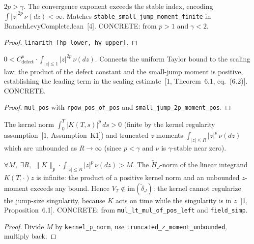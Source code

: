 \begin{theorem}\label{thm:two_p_gt_gamma}
\leanok
{}
$2p > \gamma$. The convergence exponent exceeds the stable index, encoding $\int |z|^{2p}\,\nu(dz) < \infty$. Matches \texttt{stable\_small\_jump\_moment\_finite} in BanachLevyComplete.lean~[4]. CONCRETE: from $p > 1$ and $\gamma < 2$.
\end{theorem}
\begin{proof}\leanok \texttt{linarith [hp\_lower, hγ\_upper]}.\end{proof}

\begin{theorem}\label{thm:defect_norm_from_uniform_bound}
\leanok
{}
$0 < C_{\mathrm{defect}}^p \cdot \int_{|z| \leq 1} |z|^{2p}\,\nu(dz)$. Connects the uniform Taylor bound to the scaling law: the product of the defect constant and the small-jump moment is positive, establishing the leading term in the scaling estimate~[1, Theorem~6.1, eq.~(6.2)]. CONCRETE.
\end{theorem}
\begin{proof}\leanok \texttt{mul\_pos} with \texttt{rpow\_pos\_of\_pos} and \texttt{small\_jump\_2p\_moment\_pos}.\end{proof}

\begin{defn}\label{def:NuSingularityData}
\leanok
The kernel norm $\int_0^T |K(T,s)|^p\,ds > 0$ (finite by the kernel regularity assumption~[1, Assumption~K1]) and truncated $z$-moments $\int_{|z| \leq R} |z|^p\,\nu(dz)$ which are unbounded as $R \to \infty$ (since $p < \gamma$ and $\nu$ is $\gamma$-stable near zero).
\end{defn}

\begin{theorem}\label{thm:nu_singularity_persists}
\leanok
{}
$\forall M,\;\exists R,\;\|K\|_p \cdot \int_{|z| \leq R} |z|^p\,\nu(dz) > M$. The $\tilde{H}_J$-norm of the linear integrand $K(T,\cdot)z$ is infinite: the product of a positive kernel norm and an unbounded $z$-moment exceeds any bound. Hence $V_T \notin \mathrm{im}(\tilde{\delta}_J)$: the kernel cannot regularize the jump-size singularity, because $K$ acts on time while the singularity is in $z$~[1, Proposition~6.1]. CONCRETE: from \texttt{mul\_lt\_mul\_of\_pos\_left} and \texttt{field\_simp}.
\end{theorem}
\begin{proof}\leanok Divide $M$ by \texttt{kernel\_p\_norm}, use \texttt{truncated\_z\_moment\_unbounded}, multiply back.\end{proof}

